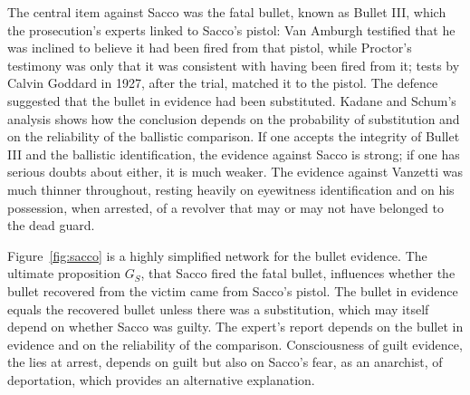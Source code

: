 The central item against Sacco was the fatal bullet, known as Bullet III, which the prosecution's experts linked to Sacco's pistol: Van Amburgh testified that he was inclined to believe it had been fired from that pistol, while Proctor's testimony was only that it was consistent with having been fired from it; tests by Calvin Goddard in 1927, after the trial, matched it to the pistol. The defence suggested that the bullet in evidence had been substituted. Kadane and Schum's analysis shows how the conclusion depends on the probability of substitution and on the reliability of the ballistic comparison. If one accepts the integrity of Bullet III and the ballistic identification, the evidence against Sacco is strong; if one has serious doubts about either, it is much weaker. The evidence against Vanzetti was much thinner throughout, resting heavily on eyewitness identification and on his possession, when arrested, of a revolver that may or may not have belonged to the dead guard.

Figure~\ref{fig:sacco} is a highly simplified network for the bullet evidence. The ultimate proposition $G_S$, that Sacco fired the fatal bullet, influences whether the bullet recovered from the victim came from Sacco's pistol. The bullet in evidence equals the recovered bullet unless there was a substitution, which may itself depend on whether Sacco was guilty. The expert's report depends on the bullet in evidence and on the reliability of the comparison. Consciousness of guilt evidence, the lies at arrest, depends on guilt but also on Sacco's fear, as an anarchist, of deportation, which provides an alternative explanation.

